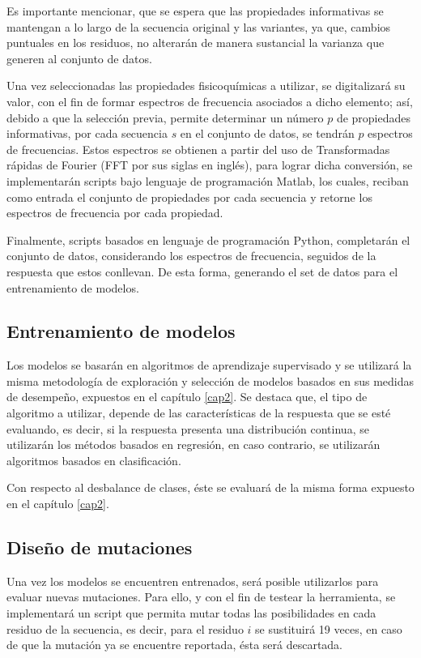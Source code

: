 Es importante mencionar, que se espera que las propiedades informativas se mantengan a lo largo de la secuencia original y las variantes, ya que, cambios puntuales en los residuos, no alterarán de manera sustancial la varianza que generen al conjunto de datos.

Una vez seleccionadas las propiedades fisicoquímicas a utilizar, se digitalizará su valor, con el fin de formar espectros de frecuencia asociados a dicho elemento; así, debido a que la selección previa, permite determinar un número $p$ de propiedades informativas, por cada secuencia $s$ en el conjunto de datos, se tendrán $p$ espectros de frecuencias. Estos espectros se obtienen a partir del uso de Transformadas rápidas de Fourier (FFT por sus siglas en inglés), para lograr dicha conversión, se implementarán scripts bajo lenguaje de programación Matlab, los cuales, reciban como entrada el conjunto de propiedades por cada secuencia y retorne los espectros de frecuencia por cada propiedad. 

Finalmente, scripts basados en lenguaje de programación Python, completarán el conjunto de datos, considerando los espectros de frecuencia, seguidos de la respuesta que estos conllevan. De esta forma, generando el set de datos para el entrenamiento de modelos.

\subsection{Entrenamiento de modelos}

Los modelos se basarán en algoritmos de aprendizaje supervisado y se utilizará la misma metodología de exploración y selección de modelos basados en sus medidas de desempeño, expuestos en el capítulo \ref{cap2}. Se destaca que, el tipo de algoritmo a utilizar, depende de las características de la respuesta que se esté evaluando, es decir, si la respuesta presenta una distribución continua, se utilizarán los métodos basados en regresión, en caso contrario, se utilizarán algoritmos basados en clasificación.

Con respecto al desbalance de clases, éste se evaluará de la misma forma expuesto en el capítulo \ref{cap2}. 

\subsection{Diseño de mutaciones}

Una vez los modelos se encuentren entrenados, será posible utilizarlos para evaluar nuevas mutaciones. Para ello, y con el fin de testear la herramienta, se implementará un script que permita mutar todas las posibilidades en cada residuo de la secuencia, es decir, para el residuo $i$ se sustituirá 19 veces, en caso de que la mutación ya se encuentre reportada, ésta será descartada. 

